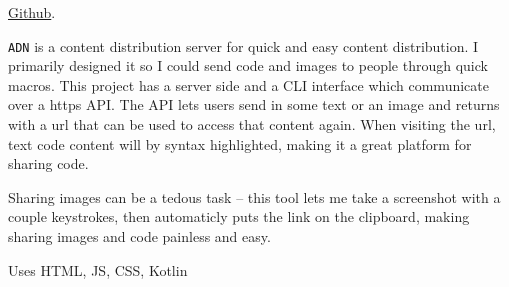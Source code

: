 \documentclass[10pt,letterpaper]{article}
\def\code#1{\texttt{#1}}
\begin{document}
    \href{https://github.com/mee42/adn}{Github}.
    
    \code{ADN} is a content distribution server for quick and easy content distribution.
    I primarily designed it so I could send code and images to people through quick macros.
    This project has a server side and a CLI interface which communicate over a https API.
    The API lets users send in some text or an image
    and returns with a url that can be used to access that content again.
    When visiting the url, text code content will by syntax highlighted,
    making it a great platform for sharing code.

    Sharing images can be a tedous task -- 
    this tool lets me take a screenshot with a couple keystrokes,
    then automaticly puts the link on the clipboard,
    making sharing images and code painless and easy.

    \vspace{0.5em}
    \noindent Uses HTML, JS, CSS, Kotlin
\end{document}

